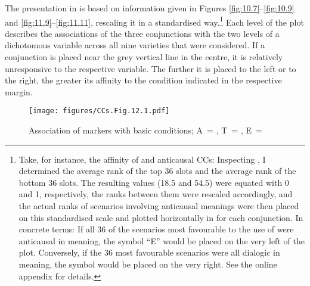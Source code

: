 The presentation in  is based on information given in Figures \ref{fig:10.7}–\ref{fig:10.9} and \ref{fig:11.9}–\ref{fig:11.11}, rescaling it in a standardised way.\footnote{Take, for instance, the affinity of  and anticausal CCs: Inspecting , I determined the average rank of the top 36 slots and the average rank of the bottom 36 slots. The resulting values (18.5 and 54.5) were equated with 0 and 1, respectively, the ranks between them were rescaled accordingly, and the actual ranks of scenarios involving anticausal meanings were then placed on this standardised scale and plotted horizontally in  for each conjunction. In concrete terms: If all 36 of the scenarios most favourable to the use of  were anticausal in meaning, the symbol “E” would be placed on the very left of the plot. Conversely, if the 36 most favourable scenarios were all dialogic in meaning, the symbol would be placed on the very right. See the online appendix for details.\label{fn95}} Each level of the plot describes the associations of the three conjunctions with the two levels of a dichotomous variable across all nine varieties that were considered. If a conjunction is placed near the grey vertical line in the centre, it is relatively unresponsive to the respective variable. The further it is placed to the left or to the right, the greater its affinity to the condition indicated in the respective margin.

\begin{figure}
\texttt{[image: figures/CCs.Fig.12.1.pdf]}
\caption{\label{bkm:Ref80960298}\label{fig:12.1}Association of markers with basic conditions; A~= , T~= , E~= }
\end{figure}

